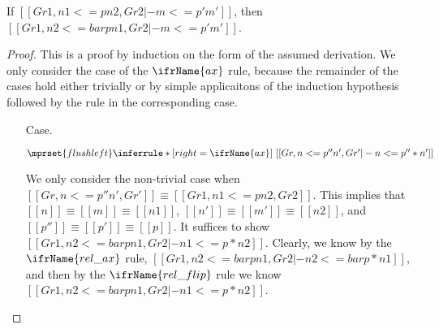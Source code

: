 \begin{lemma}[RelAssumFlip]
  \label{lemma:relassumflip}
  If $[[Gr1 , n1 <=p n2, Gr2 |- m <=p' m']]$, then $[[Gr1 , n2 <=bar p n1, Gr2 |- m <=p' m']]$.
\end{lemma}
  \begin{proof}
    This is a proof by induction on the form of the assumed
    derivation.  We only consider the case of the $\ifrName{ax}$ rule,
    because the remainder of the cases hold either trivially or by
    simple applicaitons of the induction hypothesis followed by the
    rule in the corresponding case.

    
    \begin{itemize}
    \item[Case.]\ \\ 
      \begin{center}
        \begin{math}
          $$\mprset{flushleft}
          \inferrule* [right=\ifrName{ax}] {
            \ 
          }{[[Gr , n <= p'' n' , Gr' |- n <= p'' * n']]}
        \end{math}
      \end{center}
      We only consider the non-trivial case when $[[Gr , n <= p'' n' , Gr']] \equiv [[Gr1 , n1 <=p n2, Gr2]]$.
      This implies that $[[n]] \equiv [[m]] \equiv [[n1]]$, $[[n']] \equiv [[m']] \equiv [[n2]]$, and 
      $[[p'']] \equiv [[p']] \equiv [[p]]$.  
      It suffices to show $[[Gr1 , n2 <=bar p n1, Gr2 |- n1 <= p * n2]]$.  Clearly, we know by the $\ifrName{rel\_ax}$
      rule, $[[Gr1 , n2 <=bar p n1, Gr2 |- n2 <=bar p * n1]]$, and then by the $\ifrName{rel\_flip}$ rule we know
      $[[Gr1 , n2 <=bar p n1, Gr2 |- n1 <=p * n2]]$.    
    \end{itemize}
  \end{proof}

